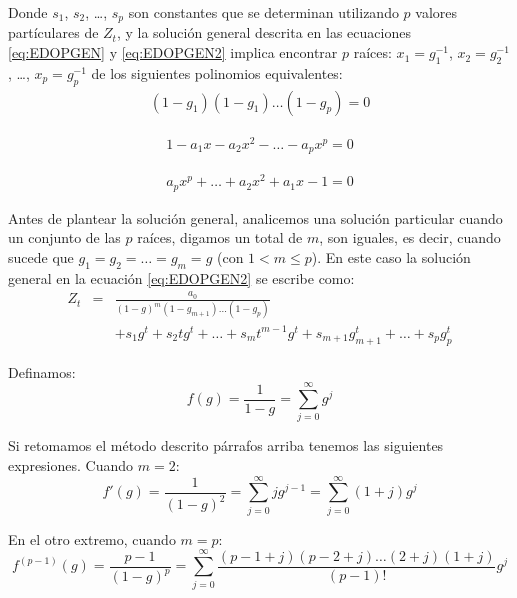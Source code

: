 \documentclass[
]{book}
\begin{document}
Donde \(s_1\), \(s_2\), \ldots, \(s_p\) son constantes que se determinan utilizando \(p\) valores partículares de \(Z_t\), y la solución general descrita en las ecuaciones \eqref{eq:EDOPGEN} y \eqref{eq:EDOPGEN2} implica encontrar \(p\) raíces: \(x_1 = g^{-1}_1\), \(x_2 = g^{-1}_2\), \ldots, \(x_p = g^{-1}_p\) de los siguientes polinomios equivalentes:
\begin{eqnarray}
    (1 - g_1)(1 - g_1) \ldots (1 - g_p) = 0
    \label{eq:POLGEN1}
\end{eqnarray}

\begin{eqnarray}
    1 - a_1 x - a_2 x^2 - \ldots - a_p x^p = 0
    \label{eq:POLGEN2}
\end{eqnarray}

\begin{eqnarray}
    a_p x^p + \ldots + a_2 x^2 + a_1 x - 1 = 0
    \label{eq:POLGEN3}
\end{eqnarray}

Antes de plantear la solución general, analicemos una solución particular cuando un conjunto de las \(p\) raíces, digamos un total de \(m\), son iguales, es decir, cuando sucede que \(g_1 = g_2 = \ldots = g_m = g\) (con \(1 < m \leq p\)). En este caso la solución general en la ecuación \eqref{eq:EDOPGEN2} se escribe como:
\begin{eqnarray}
    Z_t & = & \frac{a_0}{(1 - g)^m(1 - g_{m+1}) \ldots (1 - g_p)} \nonumber \\ 
    & & + s_1 g^t + s_2 t g^t + \ldots + s_m t^{m-1} g^t + s_{m+1} g^t_{m+1} + \ldots + s_{p} g^t_{p}
    \label{eq:EDOPGEN3}
\end{eqnarray}

Definamos:
\begin{equation}
    f(g) = \frac{1}{1 - g} = \sum_{j = 0}^{\infty} g^j
    \label{eq:EDOPGEN4}
\end{equation}

Si retomamos el método descrito párrafos arriba tenemos las siguientes expresiones. Cuando \(m = 2\):
\begin{equation}
    f'(g) = \frac{1}{(1 - g)^2} = \sum_{j = 0}^{\infty} j g^{j-1} = \sum_{j = 0}^{\infty} (1 + j) g^j \nonumber
\end{equation}

En el otro extremo, cuando \(m = p\):
\begin{equation}
    f^{(p-1)}(g) = \frac{p-1}{(1 - g)^p} = \sum_{j = 0}^{\infty} \frac{(p-1+j)(p-2+j) \ldots (2+j)(1+j)}{(p-1)!} g^j
    \label{eq:EDOPGEN5}
\end{equation}
\end{document}
